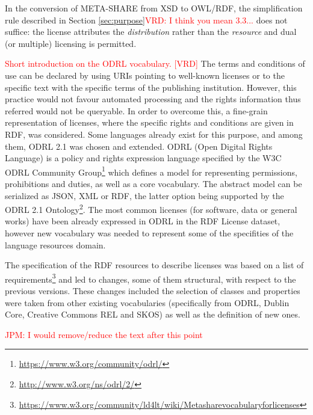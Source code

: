\documentclass{llncs}
\begin{document}
{In the conversion of META-SHARE from XSD to OWL/RDF, the simplification rule described in Section \ref{sec:purpose}\textcolor{red}{VRD: I think you mean 3.3...} does not suffice: the license attributes the \textit{distribution} rather than the \textit{resource} and dual (or multiple) licensing is permitted.

\textcolor{red}{Short introduction on the ODRL vocabulary. [VRD]}
The terms and conditions of use can be declared by using URIs pointing to well-known licenses or to the specific text with the specific terms of the publishing institution. However, this practice would not favour automated processing and the rights information thus referred would not be queryable. In order to overcome this, a fine-grain representation of licenses, where the specific rights and conditions are given in RDF, was considered. Some languages already exist for this purpose, and among them, ODRL 2.1 was chosen and extended. ODRL (Open Digital Rights Language) is a policy and rights expression language specified by the W3C ODRL Community Group\footnote{\url{https://www.w3.org/community/odrl/}} which defines a model for representing permissions, prohibitions and duties, as well as a core vocabulary. The abstract model can be serialized as JSON, XML or RDF, the latter option being supported by the ODRL 2.1 Ontology\footnote{\url{http://www.w3.org/ns/odrl/2/}}. The most common licenses (for software, data or general works) have been already expressed in ODRL in the RDF License dataset\cite{rdflicense}, however new vocabulary was needed to represent some of the specifities of the language resources domain. 

The specification of the RDF resources to describe licenses was based on a list of requirements\footnote{\url{https://www.w3.org/community/ld4lt/wiki/Metasharevocabularyforlicenses}} and led to changes, some of them structural, with respect to the previous versions. 
These changes included the selection of classes and properties were taken from other existing vocabularies (specifically from ODRL, Dublin Core, Creative Commons REL and SKOS) as well as the definition of new ones. 

\textcolor{red}{JPM: I would remove/reduce the text after this point}

}
\end{document}

